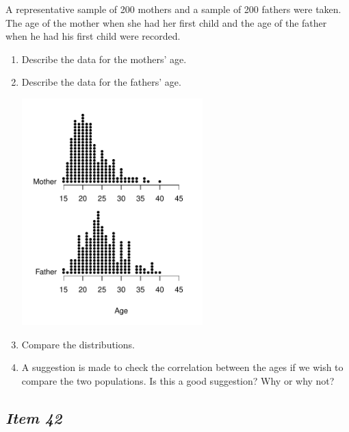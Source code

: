 A representative sample of 200 mothers and a sample of 200 fathers were taken. The age of the mother when she had her first child and the age of the father when he had his first child were recorded.





\begin{enumerate}[leftmargin=1cm, itemsep=.2em]


\item Describe the data for the mothers' age.


\item Describe the data for the fathers' age.


\begin{marginfigure}


\includegraphics[width=2.75in]{includes/Item35.pdf}


\end{marginfigure}


\item Compare the distributions.


\item A suggestion is made to check the correlation between the ages if we wish to compare the two populations. Is this a good suggestion? Why or why not?


\end{enumerate}





\subsection{\textbf{\textit{Item 42}}}


